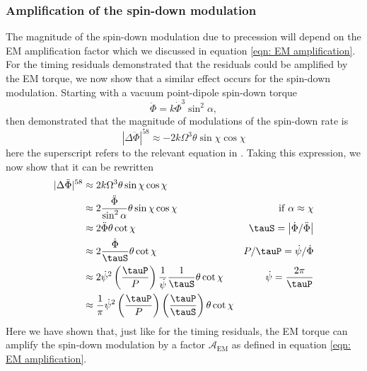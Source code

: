 \documentclass[/home/greg/Thesis/main/main.tex]{subfiles}
\begin{document}
\subsubsection{Amplification of the spin-down modulation}
The magnitude of the spin-down modulation due to precession will 
depend on the EM amplification factor which we discussed in equation 
\eqref{eqn: EM amplification}. For the timing residuals \citet{Jones2001}
demonstrated that the residuals could be amplified by the EM torque, we now
show that a similar effect occurs for the 
spin-down modulation. Starting with a vacuum point-dipole spin-down torque
\begin{equation}
    \ddot{\Phi} = k\dot{\Phi}^{3}\sin^{2}\alpha,
\end{equation}
then \citet{Jones2001} demonstrated that the magnitude of modulations of the 
spin-down rate is
\begin{equation}
    |\Delta\ddot{\Phi}|^{58} \approx -2k\Omega^{3} \theta \sin\chi \cos\chi 
\end{equation}
here the superscript refers to the relevant equation in \citet{Jones2001}. Taking
this expression, we now show that it can be rewritten
\begin{align}
    |\Delta\ddot{\Phi}|^{58} 
    & \approx 2k\Omega^{3} \theta \sin\chi \cos\chi & \\
    & \approx 2 \frac{\ddot{\Phi}}{\sin^{2}\alpha} \theta \sin\chi\cos\chi &
    \mathrm{if }\; \alpha \approx \chi \\
    & \approx 2 \ddot{\Phi}\theta \cot\chi & 
    \tauS = \left| \dot{\Phi} / \ddot{\Phi}\right| \\
    & \approx 2 \frac{\dot{\Phi}}{\tauS} \theta \cot\chi &
    P/\tauP = \dot{\psi}/\dot{\Phi} \\
    & \approx 2 \dot{\psi}^{2}\left(\frac{\tauP}{P}\right) \frac{1}{\dot{\psi}} \frac{1}{\tauS} \theta \cot \chi & \dot{\psi} = \frac{2\pi}{\tauP} \\
    & \approx \frac{1}{\pi}\dot{\psi}^{2}\left(\frac{\tauP}{P}\right)\left(\frac{\tauP}{\tauS}\right) \theta \cot\chi
    \label{eqn: spin-down variations FP EM}
\end{align}
Here we have shown that, just like for the timing residuals, the EM torque can
amplify the spin-down modulation by a factor $\mathcal{A}_{\mathrm{EM}}$ as defined in equation \eqref{eqn: EM amplification}.
\end{document}
